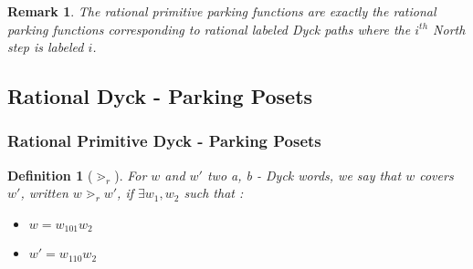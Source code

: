 \documentclass[12pt]{report}
\newtheorem{definition}{Definition}
\newtheorem*{rem}{Remark}
\begin{document}
\begin{rem}
    The rational primitive parking functions are exactly the
    rational parking functions corresponding to rational labeled
    Dyck paths where the $i^{th}$ North step is labeled $i$.
\end{rem}

\subsection{Rational Dyck - Parking Posets}

\subsubsection{Rational Primitive Dyck - Parking Posets}

\begin{definition}[$\gtrdot_r$]
    For $w$ and $w'$ two a, b - Dyck words, we say that $w$
    covers $w'$, written $w \gtrdot_r w'$, if
    $\exists w_1, w_2$ such that :
    \begin{itemize}
        \item $w = w_101w_2$
        \item $w' = w_110w_2$
    \end{itemize}  
\end{definition}
\end{document}
